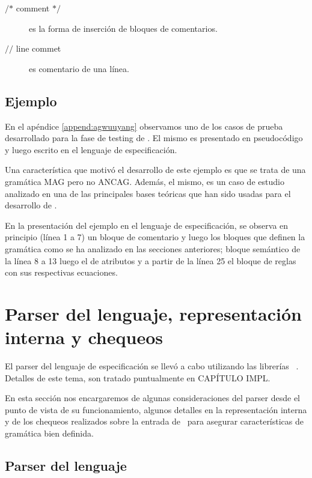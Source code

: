 \begin{description}
\item [$\textbf{/*}$ comment $\textbf{*/}$] es la forma de inserción de bloques de comentarios.
\item [$\textbf{//}$ line commet] es comentario de una línea.
\end{description} 

\subsection{Ejemplo}

En el apéndice \ref{append:agwuuyang} observamos uno de los casos de prueba desarrollado para la fase de testing de \maggen. El mismo es presentado en pseudocódigo y luego escrito en el lenguaje de especificación. 

Una característica que motivó el desarrollo de este ejemplo es que se trata de una gramática MAG pero no ANCAG. Además, el mismo, es un caso de estudio analizado en una de las principales bases teóricas que han sido usadas para el desarrollo de . 

En la presentación del ejemplo en el lenguaje de especificación, se observa en principio (línea 1 a 7) un bloque de comentario y luego los bloques que definen la gramática como se ha analizado en las secciones anteriores; bloque semántico de la línea 8 a 13 luego el de atributos y a partir de la línea 25 el bloque de reglas con sus respectivas ecuaciones.

 
\section{Parser del lenguaje, representación interna y chequeos}

El parser del lenguaje de especificación se llevó a cabo utilizando las librerías \boost\  \spirit. Detalles de este tema, son tratado puntualmente en CAPÍTULO IMPL. 

En esta sección nos encargaremos de algunas consideraciones del parser desde el punto de vista de su funcionamiento, algunos detalles en la representación interna y de los chequeos realizados sobre la entrada de \maggen\ para asegurar características de gramática bien definida.

\subsection*{Parser del lenguaje}

